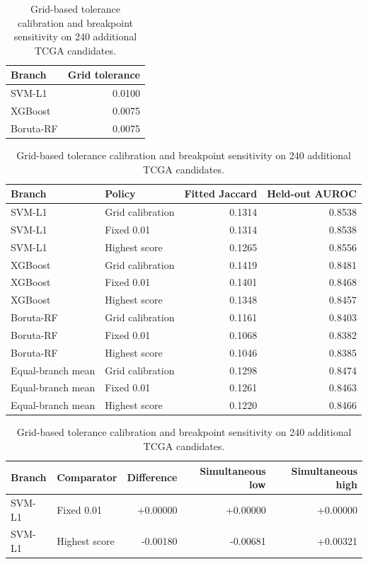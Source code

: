 \begin{table}[p]
\centering
\caption{Grid-based tolerance calibration and breakpoint sensitivity on 240 additional TCGA candidates.}
\label{tab:supp32}
\small
\renewcommand{\arraystretch}{1.10}
\setlength{\tabcolsep}{4pt}
\begin{tabular}{lr}
\toprule
Branch & Grid tolerance \\
\midrule
SVM-L1 & 0.0100 \\
XGBoost & 0.0075 \\
Boruta-RF & 0.0075 \\
\bottomrule
\end{tabular}
\par\medskip
\begin{tabular}{llrr}
\toprule
Branch & Policy & Fitted Jaccard & Held-out AUROC \\
\midrule
SVM-L1 & Grid calibration & 0.1314 & 0.8538 \\
SVM-L1 & Fixed 0.01 & 0.1314 & 0.8538 \\
SVM-L1 & Highest score & 0.1265 & 0.8556 \\
XGBoost & Grid calibration & 0.1419 & 0.8481 \\
XGBoost & Fixed 0.01 & 0.1401 & 0.8468 \\
XGBoost & Highest score & 0.1348 & 0.8457 \\
Boruta-RF & Grid calibration & 0.1161 & 0.8403 \\
Boruta-RF & Fixed 0.01 & 0.1068 & 0.8382 \\
Boruta-RF & Highest score & 0.1046 & 0.8385 \\
Equal-branch mean & Grid calibration & 0.1298 & 0.8474 \\
Equal-branch mean & Fixed 0.01 & 0.1261 & 0.8463 \\
Equal-branch mean & Highest score & 0.1220 & 0.8466 \\
\bottomrule
\end{tabular}
\par\medskip
{}
\begin{tabular}{llrrr}
\toprule
Branch & Comparator & Difference & Simultaneous low & Simultaneous high \\
\midrule
SVM-L1 & Fixed 0.01 & +0.00000 & +0.00000 & +0.00000 \\
SVM-L1 & Highest score & -0.00180 & -0.00681 & +0.00321 \\

\end{tabular}
\end{table}
